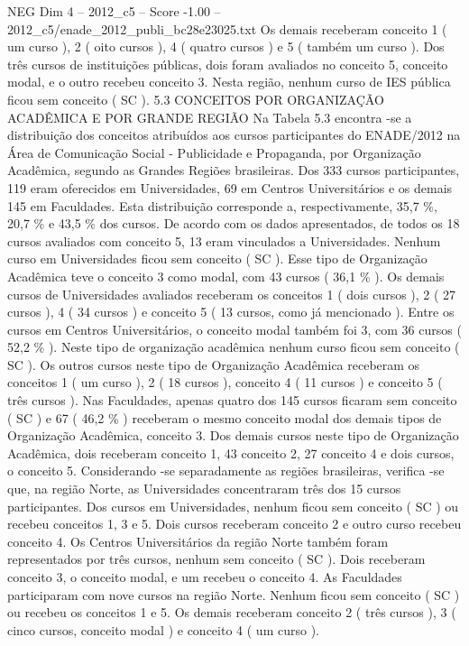 \begin{textsample}{NEG Dim 4 – 2012\_c5 – Score -1.00 – 2012\_c5/enade\_2012\_publi\_bc28e23025.txt}
Os demais receberam conceito 1 ( um curso ), 2 ( oito cursos ), 4 ( quatro cursos ) e 5 ( também um curso ).
Dos três cursos de instituições públicas, dois foram avaliados no conceito 5, conceito modal, e o outro recebeu conceito 3.
Nesta região, nenhum curso de IES pública ficou sem conceito ( SC ). 5.3 CONCEITOS POR ORGANIZAÇÃO ACADÊMICA E POR GRANDE REGIÃO Na Tabela 5.3 encontra -se a distribuição dos conceitos atribuídos aos cursos participantes do ENADE/2012 na Área de Comunicação Social - Publicidade e Propaganda, por Organização Acadêmica, segundo as Grandes Regiões brasileiras.
Dos 333 cursos participantes, 119 eram oferecidos em Universidades, 69 em Centros Universitários e os demais 145 em Faculdades.
Esta distribuição corresponde a, respectivamente, 35,7 \%, 20,7 \% e 43,5 \% dos cursos.
De acordo com os dados apresentados, de todos os 18 cursos avaliados com conceito 5, 13 eram vinculados a Universidades.
Nenhum curso em Universidades ficou sem conceito ( SC ).
Esse tipo de Organização Acadêmica teve o conceito 3 como modal, com 43 cursos ( 36,1 \% ).
Os demais cursos de Universidades avaliados receberam os conceitos 1 ( dois cursos ), 2 ( 27 cursos ), 4 ( 34 cursos ) e conceito 5 ( 13 cursos, como já mencionado ).
Entre os cursos em Centros Universitários, o conceito modal também foi 3, com 36 cursos ( 52,2 \% ).
Neste tipo de organização acadêmica nenhum curso ficou sem conceito ( SC ).
Os outros cursos neste tipo de Organização Acadêmica receberam os conceitos 1 ( um curso ), 2 ( 18 cursos ), conceito 4 ( 11 cursos ) e conceito 5 ( três cursos ).
Nas Faculdades, apenas quatro dos 145 cursos ficaram sem conceito ( SC ) e 67 ( 46,2 \% ) receberam o mesmo conceito modal dos demais tipos de Organização Acadêmica, conceito 3.
Dos demais cursos neste tipo de Organização Acadêmica, dois receberam conceito 1, 43 conceito 2, 27 conceito 4 e dois cursos, o conceito 5.
Considerando -se separadamente as regiões brasileiras, verifica -se que, na região Norte, as Universidades concentraram três dos 15 cursos participantes.
Dos cursos em Universidades, nenhum ficou sem conceito ( SC ) ou recebeu conceitos 1, 3 e 5.
Dois cursos receberam conceito 2 e outro curso recebeu conceito 4.
Os Centros Universitários da região Norte também foram representados por três cursos, nenhum sem conceito ( SC ).
Dois receberam conceito 3, o conceito modal, e um recebeu o conceito 4.
As Faculdades participaram com nove cursos na região Norte.
Nenhum ficou sem conceito ( SC ) ou recebeu os conceitos 1 e 5.
Os demais receberam conceito 2 ( três cursos ), 3 ( cinco cursos, conceito modal ) e conceito 4 ( um curso ).

\end{textsample}
